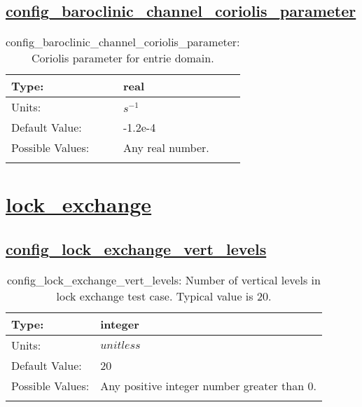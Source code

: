 \subsection[config\_baroclinic\_channel\_coriolis\_parameter]{\hyperref[sec:nm_tab_baroclinic_channel]{config\_baroclinic\_channel\_coriolis\_parameter}}
\label{subsec:nm_sec_config_baroclinic_channel_coriolis_parameter}
\begin{center}
\begin{longtable}{| p{2.0in} || p{4.0in} |}
    \hline
    Type: & real \\
    \hline
    Units: & $s^{-1}$ \\
    \hline
    Default Value: & -1.2e-4 \\
    \hline
    Possible Values: & Any real number. \\
    \hline
    \caption{config\_baroclinic\_channel\_coriolis\_parameter: Coriolis parameter for entrie domain.}
\end{longtable}
\end{center}
\section[lock\_exchange]{\hyperref[sec:nm_tab_lock_exchange]{lock\_exchange}}
\label{sec:nm_sec_lock_exchange}
\subsection[config\_lock\_exchange\_vert\_levels]{\hyperref[sec:nm_tab_lock_exchange]{config\_lock\_exchange\_vert\_levels}}
\label{subsec:nm_sec_config_lock_exchange_vert_levels}
\begin{center}
\begin{longtable}{| p{2.0in} || p{4.0in} |}
    \hline
    Type: & integer \\
    \hline
    Units: & $unitless$ \\
    \hline
    Default Value: & 20 \\
    \hline
    Possible Values: & Any positive integer number greater than 0. \\
    \hline
    \caption{config\_lock\_exchange\_vert\_levels: Number of vertical levels in lock exchange test case. Typical value is 20.}
\end{longtable}
\end{center}
